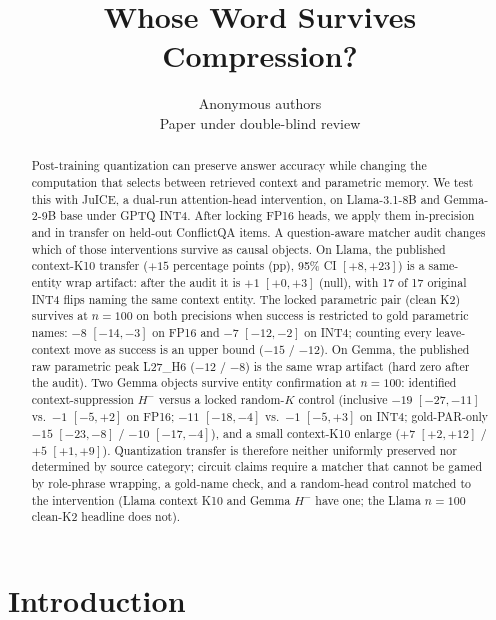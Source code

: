 \documentclass{article} %
\title{Whose Word Survives Compression?}
\author{Anonymous authors \\ Paper under double-blind review}
\begin{document}
\maketitle

\begin{abstract}
Post-training quantization can preserve answer accuracy while changing the computation that selects between retrieved context and parametric memory. We test this with JuICE, a dual-run attention-head intervention, on Llama-3.1-8B and Gemma-2-9B base under GPTQ INT4. After locking FP16 heads, we apply them in-precision and in transfer on held-out ConflictQA items. A question-aware matcher audit changes which of those interventions survive as causal objects. On Llama, the published context-K10 transfer ($+15$ percentage points (pp), 95\% CI $[+8,+23]$) is a same-entity wrap artifact: after the audit it is $+1$ $[+0,+3]$ (null), with 17 of 17 original INT4 flips naming the same context entity. The locked parametric pair (clean K2) survives at $n{=}100$ on both precisions when success is restricted to gold parametric names: $-8$ $[-14,-3]$ on FP16 and $-7$ $[-12,-2]$ on INT4; counting every leave-context move as success is an upper bound ($-15$ / $-12$). On Gemma, the published raw parametric peak L27\_H6 ($-12$ / $-8$) is the same wrap artifact (hard zero after the audit). Two Gemma objects survive entity confirmation at $n{=}100$: identified context-suppression $H^{-}$ versus a locked random-$K$ control (inclusive $-19$ $[-27,-11]$ vs.\ $-1$ $[-5,+2]$ on FP16; $-11$ $[-18,-4]$ vs.\ $-1$ $[-5,+3]$ on INT4; gold-PAR-only $-15$ $[-23,-8]$ / $-10$ $[-17,-4]$), and a small context-K10 enlarge ($+7$ $[+2,+12]$ / $+5$ $[+1,+9]$). Quantization transfer is therefore neither uniformly preserved nor determined by source category; circuit claims require a matcher that cannot be gamed by role-phrase wrapping, a gold-name check, and a random-head control matched to the intervention (Llama context K10 and Gemma $H^{-}$ have one; the Llama $n{=}100$ clean-K2 headline does not).
\end{abstract}

\section{Introduction}
\label{sec:intro}
\end{document}
